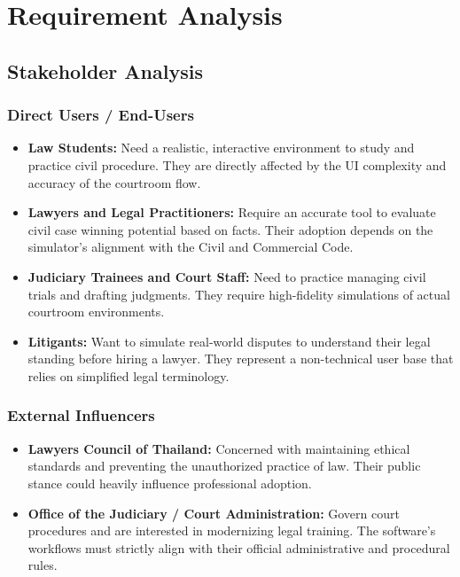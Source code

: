 \chapter{Requirement Analysis}
\label{chap:requirement-analysis}

\section{Stakeholder Analysis}
\label{section:stakeholder-analysis}

\subsection{Direct Users / End-Users}
\begin{itemize}
    \item \textbf{Law Students:} Need a realistic, interactive environment to study and practice civil procedure. They are directly affected by the UI complexity and accuracy of the courtroom flow.
    \item \textbf{Lawyers and Legal Practitioners:} Require an accurate tool to evaluate civil case winning potential based on facts. Their adoption depends on the simulator's alignment with the Civil and Commercial Code.
    \item \textbf{Judiciary Trainees and Court Staff:} Need to practice managing civil trials and drafting judgments. They require high-fidelity simulations of actual courtroom environments.
    \item \textbf{Litigants:} Want to simulate real-world disputes to understand their legal standing before hiring a lawyer. They represent a non-technical user base that relies on simplified legal terminology.
\end{itemize}

\subsection{External Influencers}
\begin{itemize}
    \item \textbf{Lawyers Council of Thailand:} Concerned with maintaining ethical standards and preventing the unauthorized practice of law. Their public stance could heavily influence professional adoption.
    \item \textbf{Office of the Judiciary / Court Administration:} Govern court procedures and are interested in modernizing legal training. The software's workflows must strictly align with their official administrative and procedural rules.
\end{itemize}


